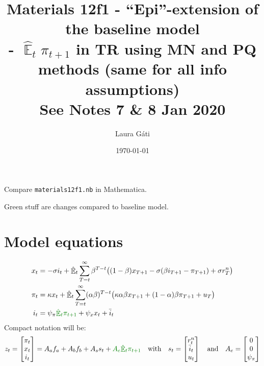\documentclass[11pt]{article}
\renewcommand{\[}{\begin{equation}}
\renewcommand{\]}{\end{equation}}
\DeclareMathOperator{\E}{\mathbb{E}}
\begin{document}
\linespread{1.0}

\title{Materials 12f1 - ``Epi''-extension of the baseline model\\
- $\hat{\E}_t\pi_{t+1}$ in TR using MN and PQ methods (same for all info assumptions)
\\
\small{See Notes 7 \& 8 Jan 2020}}
\author{Laura G\'ati} 
\date{\today}
\maketitle




Compare \texttt{materials12f1.nb} in Mathematica.

\textcolor{mygreen}{Green} stuff are changes compared to baseline model.
\section{Model equations}
\begin{align}
x_t &=  -\sigma i_t +\hat{\E}_t \sum_{T=t}^{\infty} \beta^{T-t }\big( (1-\beta)x_{T+1} - \sigma(\beta i_{T+1} - \pi_{T+1}) +\sigma r_T^n \big)  \label{prestons18}  \\
\pi_t &= \kappa x_t +\hat{\E}_t \sum_{T=t}^{\infty} (\alpha\beta)^{T-t }\big( \kappa \alpha \beta x_{T+1} + (1-\alpha)\beta \pi_{T+1} + u_T\big) \label{prestons19}  \\
i_t &= \psi_{\pi}\textcolor{mygreen}{\hat{\E}_t\pi_{t+1}} + \psi_{x} x_t  + \bar{i}_t \label{TR}
\end{align}
Compact notation will be:
\begin{equation}
z_t = \begin{bmatrix} \pi_t \\ x_t \\ i_t \end{bmatrix} = A_a f_{a} + A_b f_{b} + A_s s_t + \textcolor{mygreen}{A_e\hat{\E}_t\pi_{t+1}} \quad \text{with} \quad s_t = \begin{bmatrix} r_t^n \\ \bar{i}_t \\ u_t \end{bmatrix} \quad \text{and} \quad A_e = \begin{bmatrix} 0 \\ 0\\ \psi_{\pi} \end{bmatrix}
\end{equation}
\end{document}
